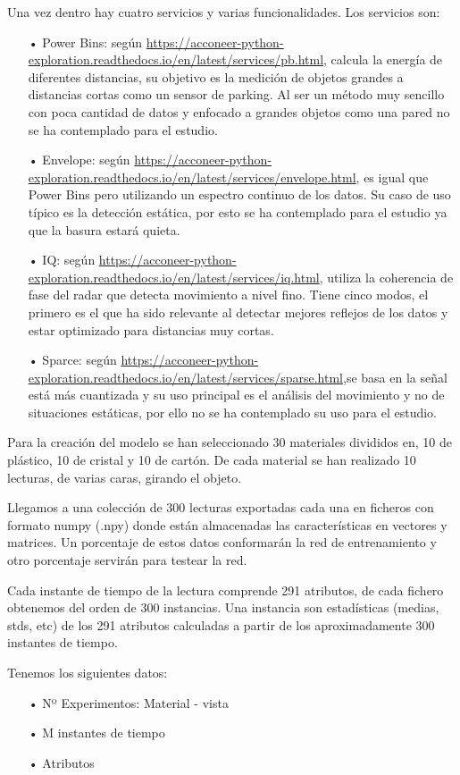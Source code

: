 Una vez dentro hay cuatro servicios y varias funcionalidades. Los servicios son:
\begin{itemize}
\item[•] Power Bins: según \url{https://acconeer-python-exploration.readthedocs.io/en/latest/services/pb.html}, calcula la energía de diferentes distancias, su objetivo es la medición de objetos grandes a distancias cortas como un sensor de parking. Al ser un método muy sencillo con poca cantidad de datos y enfocado a grandes objetos como una pared no se ha contemplado para el estudio.
\item[•] Envelope: según \url{https://acconeer-python-exploration.readthedocs.io/en/latest/services/envelope.html}, es igual que Power Bins pero utilizando un espectro continuo de los datos. Su caso de uso típico es la detección estática, por esto se ha contemplado para el estudio ya que la basura estará quieta.
\item[•] IQ: según \url{https://acconeer-python-exploration.readthedocs.io/en/latest/services/iq.html}, utiliza la coherencia de fase del radar que detecta movimiento a nivel fino. Tiene cinco modos, el primero es el que ha sido relevante al detectar mejores reflejos de los datos y estar optimizado para distancias muy cortas.
\item[•] Sparce: según \url{https://acconeer-python-exploration.readthedocs.io/en/latest/services/sparse.html},se basa en la señal está más cuantizada y su uso principal es el análisis del movimiento y no de situaciones estáticas, por ello no se ha contemplado su uso para el estudio.
\end{itemize}

Para la creación del modelo se han seleccionado 30 materiales divididos en, 10 de plástico, 10 de cristal y 10 de cartón. De cada material se han realizado 10 lecturas, de varias caras, girando el objeto.

Llegamos a una colección de 300 lecturas exportadas cada una en ficheros con formato numpy (.npy) donde están almacenadas las características en vectores y matrices. Un porcentaje de estos datos conformarán la red de entrenamiento y otro porcentaje servirán para testear la red.

Cada instante de tiempo de la lectura comprende 291 atributos, de cada fichero obtenemos del orden de 300 instancias.
Una instancia son estadísticas (medias, stds, etc) de los 291 atributos calculadas a partir de los aproximadamente 300 instantes de tiempo.

Tenemos los siguientes datos:
\begin{itemize}
\item[•] Nº Experimentos: Material - vista
\item[•] M instantes de tiempo
\item[•] Atributos
\end{itemize}
